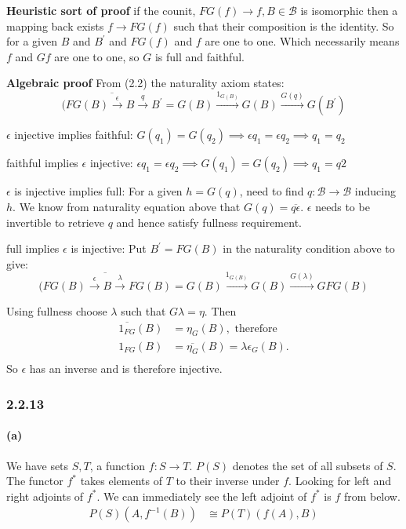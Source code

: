 \documentclass{article}
\begin{document}
\textbf{Heuristic sort of proof}
if the counit, $FG (f) \rightarrow f, B \in \mathcal{B}$ is isomorphic then a mapping back exists $f \rightarrow FG (f)$ such that their composition is the identity. So for a given $B$ and $B^\prime$ and $FG(f)$ and $f$ are one to one. Which necessarily means $f$ and $Gf$ are one to one, so $G$ is full and faithful.

\textbf{Algebraic proof}
From (2.2) the naturality axiom states:
\begin{equation*}
\overline{(FG(B) \xrightarrow{\epsilon} B \xrightarrow{q} {B^\prime}} =
G(B) \xrightarrow{1_{G(B)}} G(B) \xrightarrow{G(q)} G(B^\prime)
\end{equation*}

$\epsilon$ injective implies faithful:
$G(q_1) = G(q_2) \implies \epsilon q_1 = \epsilon q_2 \implies q_1 = q_2$

faithful implies $\epsilon$ injective:
$\epsilon q_1 = \epsilon q_2 \implies G(q_1) = G(q_2) \implies q_1 = q2$

$\epsilon$ is injective implies full:
For a given $h = G(q)$, need to find $q: \mathcal{B} \rightarrow \mathcal{B}$ inducing $h$. We know from naturality equation above that $G(q) = \overline{q\epsilon}$. $\epsilon$ needs to be invertible to retrieve $q$ and hence satisfy fullness requirement.

full implies $\epsilon$ is injective: Put $B^\prime = FG(B)$ in the naturality condition above to give:
\begin{equation*}
\overline{(FG(B) \xrightarrow{\epsilon} B \xrightarrow{\lambda} {FG(B)}} =
G(B) \xrightarrow{1_{G(B)}} G(B) \xrightarrow{G(\lambda)} GFG(B)
\end{equation*}

Using fullness choose $\lambda$ such that $G\lambda = \eta$. Then
\begin{align*}
  \overline{1_{FG}}(B) &= \eta_G(B), \text{ therefore } \\
  1_{FG}(B) &= \overline{\eta_G}(B) = \lambda\epsilon_G(B). \\
\end{align*}
So $\epsilon$ has an inverse and is therefore injective.

\subsubsection*{2.2.13}
\paragraph{(a)}
We have sets $S, T$, a function $f\colon S \rightarrow T$. $P(S)$ denotes the set of all subsets of $S$. The functor $f^*$ takes elements of $T$ to their inverse under $f$. Looking for left and right adjoints of $f^*$. We can immediately see the left adjoint of $f^*$ is $f$ from below.
\begin{align}
\label{eqn:2213a1}
  P(S)(A,f^{-1}(B)) & \cong P(T)(f(A), B)
\end{align}
\end{document}
